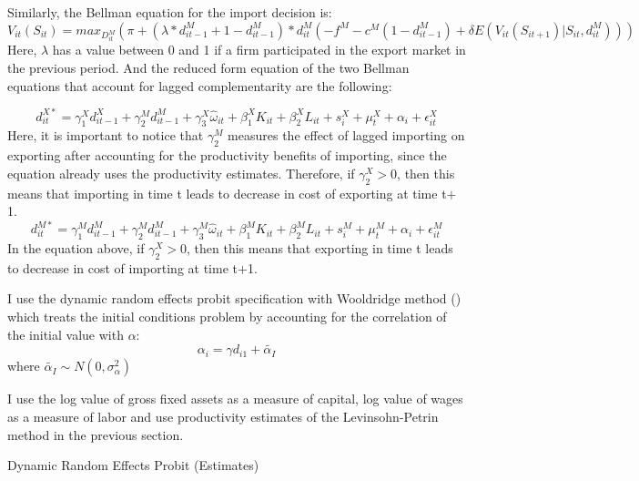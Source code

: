 \documentclass[11pt]{article}
\begin{document}
Similarly, the Bellman equation for the import decision is: 
\begin{equation}
V_{it}(S_{it})= max_{D_{it}^{M}}(\pi + (\lambda *d_{it-1}^{M} + 1 - d_{it-1}^{M}) *d_{it}^{M}(- f^{M} -
c^{M}(1-d_{it-1}^{M})  + \delta E (V_{it}(S_{it+1})|S_{it}, d_{it}^{M})))
\end{equation}
Here, $\lambda$ has a value between 0 and 1 if a firm participated in
the export market in the previous period. And the reduced form
equation of the two Bellman equations that account for lagged
complementarity are the following:


\begin{equation}
d_{it}^{X*}=   \gamma_{1}^{X} d_{it-1}^{X} + \gamma_{2}^{M} d_{it-1}^{M}+
\gamma_{3}^{X} \hat{\omega}_{it}  + \beta_{1}^{X}K_{it}  +\beta_{2}^{X}L_{it}+
s_{i}^{X} + \mu_{t}^{X}  + \alpha_{i}+ \epsilon_{it}^{X}
\end{equation}
Here, it is important to notice that  $\gamma_{2}^{M}$ measures the effect of lagged importing on
exporting after accounting for the productivity benefits of importing,
since the equation already uses the productivity
estimates. Therefore, if $\gamma_{2}^{X}>0$, then this means that
importing in time t leads to decrease in cost of exporting at time t$+$1.  
\begin{equation}
d_{it}^{M*}=   \gamma_{1}^{M} d_{it-1}^{M} + \gamma_{2}^{M} d_{it-1}^{M}+
\gamma_{3}^{M} \hat{\omega}_{it}  + \beta_{1}^{M}K_{it}  +\beta_{2}^{M}L_{it}+
s_{i}^{M} + \mu_{t}^{M}  + \alpha_{i}+ \epsilon_{it}^{M}
\end{equation}
In the equation above, if  $\gamma_{2}^{X}>0$, then this means that
exporting in time t leads to decrease in cost of importing at time t$+$1.
  
I use the dynamic random effects probit specification with Wooldridge
method (\textcite{wooldridge2005simple}) which treats the initial conditions problem by accounting for
the correlation of the initial value with $\alpha$:
$$  \alpha_{i}= \gamma d_{i1}+ \tilde{\alpha_{I}} $$
where $ \tilde{\alpha_{I}} \sim N(0, \sigma_{\alpha}^{2}) $

I use the log value of gross fixed assets as a measure of capital, log
value of wages as a measure of labor and use productivity estimates  of
the Levinsohn-Petrin method in the previous section. 

\begin{center}
\begin{table}[H]
\caption{Dynamic Random Effects Probit (Estimates)}
\label{tab:dynprobit}

\end{table}
\end{center}
\end{document}

